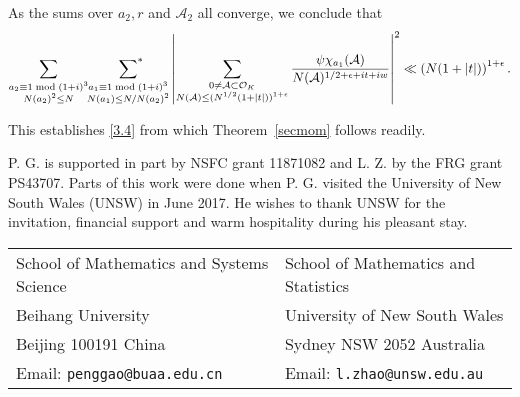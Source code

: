 \documentclass[twoside,leqno,10pt, A4]{amsart}
\begin{document}
    As the sums over $a_2, r$ and $\mathcal{A}_2$ all converge, we conclude that
\begin{align*}
   \sum_{\substack{a_2 \equiv 1 \bmod {(1+i)^3} \\ N(a_2)^2 \leq N}}\sideset{}{^*}\sum_{\substack{a_1 \equiv 1 \bmod {(1+i)^3} \\ N(a_1) \leq N/N(a_2)^2}} \left| \sum_{\substack {0 \neq \mathcal{A} \subset
  \mathcal{O}_K \\ N(\mathcal{A}) \leq (N^{1/2}(1+|t|))^{1+\epsilon}}}\frac{\psi\chi_{a_1}(\mathcal{A})}{N(\mathcal{A})^{1/2+\epsilon+it+iw}} \right|^2
   \ll \left( N(1+|t|) \right)^{1+\epsilon}.
\end{align*}

     This establishes \eqref{3.4} from which Theorem~\ref{secmom} follows readily. \newline

 P. G. is supported in part by NSFC grant 11871082 and L. Z. by the FRG grant PS43707.  Parts of this work were done when P. G. visited the University of New South Wales (UNSW) in June 2017. He wishes to thank UNSW for the invitation, financial support and warm hospitality during his pleasant stay.




\vspace*{.5cm}

\noindent\begin{tabular}{p{8cm}p{8cm}}
School of Mathematics and Systems Science & School of Mathematics and Statistics \\
Beihang University & University of New South Wales \\
Beijing 100191 China & Sydney NSW 2052 Australia \\
Email: {\tt penggao@buaa.edu.cn} & Email: {\tt l.zhao@unsw.edu.au} \\
\end{tabular}
\end{document}

